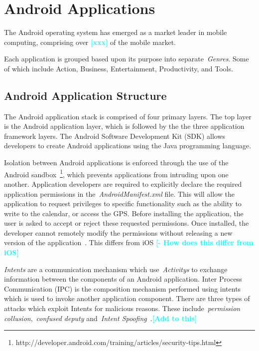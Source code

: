 \documentclass{sig-alternate}
\newcommand{\todo}[1]{\textcolor{cyan}{\textbf{[#1]}}}
\begin{document}
\label{sec: androidapplications}
\section{Android Applications}

The Android operating system has emerged as a market leader in mobile computing, comprising over \todo{xxx} of the mobile market.


Each application is grouped based upon its purpose into separate~\emph{Genres}. Some of which include Action, Business, Entertainment, Productivity,  and Tools.


\subsection{Android Application Structure}

The Android application stack is comprised of four primary layers. The top layer is the Android application layer, which is followed by the the three application framework layers. The Android Software Development Kit (SDK) allows developers to create Android applications using the Java programming language.

Isolation between Android applications is enforced through the use of the Android sandbox~\footnote{http://developer.android.com/training/articles/security-tips.html}, which prevents applications from intruding upon one another. Application developers are required to explicitly declare the required application permissions in the~\emph{AndroidManifest.xml} file. This will allow the application to request privileges to specific functionality such as the ability to write to the calendar, or access the GPS. Before installing the application, the user is asked to accept or reject these requested permissions. Once installed, the developer cannot remotely modify the permissions without releasing a new version of the application~\cite{shaerpour2013trends}. This differs from iOS \todo{- How does this differ from iOS}


\emph{Intents} are a communication mechanism which use~\emph{Activitys} to exchange information between the components of an Android application. Inter Process Communication (IPC) is the composition mechanism performed using intents which is used to invoke another application component. There are three types of attacks which exploit Intents for malicious reasons. These include~\emph{permission collusion},~\emph{confused deputy} and~\emph{Intent Spoofing}~\cite{6641043}.\todo{Add to this}
\end{document}
